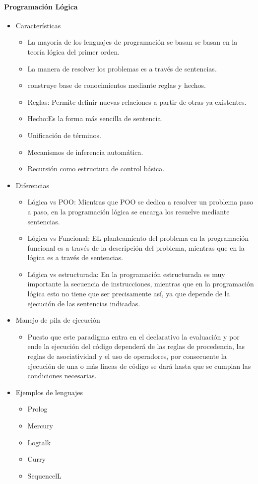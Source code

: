 \documentclass[10pt]{article}
\begin{document}
\paragraph{\normalsize Programación Lógica}
\begin{itemize}
  \item Características
    \begin{itemize}
      \item La mayoría de los lenguajes de programación se basan se basan en la teoría lógica del primer orden.
      \item La manera de resolver los problemas es a través de sentencias.
      \item construye base de conocimientos mediante reglas y hechos.
      \item Reglas: Permite definir nuevas relaciones a partir de otras ya existentes.
      \item Hecho:Es la forma más sencilla de sentencia.
      \item Unificación de términos.
      \item Mecanismos de inferencia automática.
      \item Recursión como estructura de control básica. 
    \end{itemize}
  \item Diferencias
  \begin{itemize}
    \item Lógica vs POO: Mientras que POO se dedica a resolver un problema paso a paso, en la programación lógica se encarga los resuelve mediante sentencias.
    \item Lógica vs Funcional: EL planteamiento del problema en la programación funcional es a través de la descripción del problema, mientras que en la lógica es a través de sentencias.
    \item Lógica vs estructurada: En la programación estructurada es muy importante la secuencia de instrucciones, mientras que en la programación lógica esto no tiene que ser precisamente así, ya que depende de la ejecución de las sentencias indicadas.
  \end{itemize}
  \item Manejo de pila de ejecución
    \begin{itemize}
      \item Puesto que este paradigma entra en el declarativo la evaluación y por ende la ejecución del código dependerá de las reglas de procedencia, las reglas de asociatividad y el uso de operadores, por consecuente la ejecución de una o más líneas de código se dará hasta que se cumplan las condiciones necesarias.
    \end{itemize}
  \item Ejemplos de lenguajes
    \begin{itemize}
      \item Prolog
      \item Mercury
      \item Logtalk
      \item Curry
      \item SequencelL
    \end{itemize}
\end{itemize}
\end{document}
